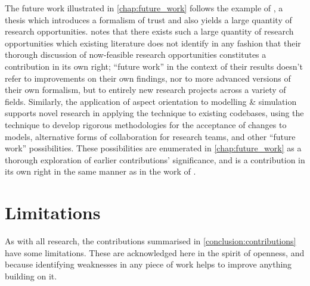 \begin{description}
    The future work illustrated in \cref{chap:future_work} follows the example
    of \citet{marsh1994formalising}, a thesis which introduces a formalism of
    trust and also yields a large quantity of research opportunities.
    \citeauthor{marsh1994formalising} notes that there exists such a large
    quantity of research opportunities which existing literature does not
    identify in any fashion that their thorough discussion of now-feasible
    research opportunities constitutes a contribution in its own right; ``future
    work'' in the context of their results doesn't refer to improvements on
    their own findings, nor to more advanced versions of their own formalism,
    but to entirely new research projects across a variety of fields. Similarly,
    the application of aspect orientation to modelling \& simulation supports
    novel research in applying the technique to existing codebases, using the
    technique to develop rigorous methodologies for the acceptance of changes to
    models, alternative forms of collaboration for research teams, and other
    ``future work'' possibilities. These possibilities are enumerated in
    \cref{chap:future_work} as a thorough exploration of earlier contributions'
    significance, and is a contribution in its own right in the same manner as
    in the work of \citet{marsh1994formalising}.

\end{description}



\section{Limitations}

As with all research, the contributions summarised in
\cref{conclusion:contributions} have some limitations. These are acknowledged
here in the spirit of openness, and because identifying weaknesses in any piece
of work helps to improve anything building on it. 

